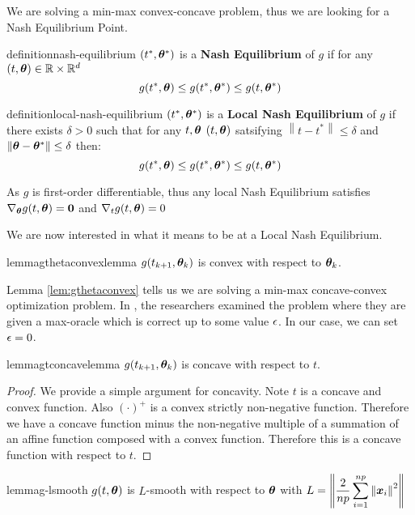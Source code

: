\documentclass{article} %
\newcommand{\norm}[1]{\left\lVert#1\right\rVert}
\begin{document}
		We are solving a min-max convex-concave problem, thus we are looking for a Nash Equilibrium Point. 
	
	\begin{restatable}{definition}{nash-equilibrium}
		\label{def:nash-equilibrium}
		$(t^*,{\bm{\theta}}^*)$ is a \textbf{Nash Equilibrium} of $g$ if for any $(t,{\bm{\theta}}) \in \mathbb{R}\times\mathbb{R}^d$\vspace{1em}
		\begin{equation}
			g(t^*,{\bm{\theta}}) \leq g(t^*,{\bm{\theta}}^*) \leq g(t,{\bm{\theta}}^*)
		\end{equation}
	\end{restatable}	
	\begin{restatable}{definition}{local-nash-equilibrium}
		\label{def:local-nash-equilibrium}
		$(t^*,{\bm{\theta}}^*)$ is a \textbf{Local Nash Equilibrium} of $g$ if there exists $\delta > 0$ such that for any $t,{\bm{\theta}}$ $(t,{\bm{\theta}})$ satsifying $\norm{t - t^*} \leq \delta$ and $\norm{\vtheta -\vtheta^*} \leq \delta$ then: 
		\vspace{1em}
		\begin{equation}
			g(t^*,{\bm{\theta}}) \leq g(t^*,{\bm{\theta}}^*) \leq g(t,{\bm{\theta}}^*)
		\end{equation}
	\end{restatable}
	\begin{proposition}\label{prop:first-order-nash}
		As $g$ is first-order differentiable, thus any local Nash Equilibrium satisfies $\nabla_{\bm{\theta}} g(t,{\bm{\theta}}) = \mathbf{0}$ and $\nabla_t g(t,{\bm{\theta}}) = 0$
	\end{proposition}
	
	We are now interested in what it means to be at a Local Nash Equilibrium. 
	
	\begin{restatable}{lemma}{gthetaconvexlemma}
		\label{lem:gthetaconvex}
		$g(t_{k+1},{\bm{\theta}}_k)$ is convex with respect to ${\bm{\theta}}_k$.
	\end{restatable}
	
	Lemma \ref{lem:gthetaconvex} tells us we are solving a min-max concave-convex optimization problem. In \cite{Jin_2019}, the researchers examined the problem where they are given a max-oracle which is correct up to some value ${\epsilon}$. In our case, we can set ${\epsilon} = 0$.
	
	\begin{restatable}{lemma}{gtconcavelemma}
		\label{lem:gtcomcavelemma}
		$g(t_{k+1},{\bm{\theta}}_k)$ is concave with respect to $t$.
	\end{restatable}
	\begin{proof}
		We provide a simple argument for concavity. Note $t$ is a concave and convex function. Also $(\cdot)^+$ is a convex strictly non-negative function. Therefore we have a concave function minus the non-negative multiple of a summation of an affine function composed with a convex function. Therefore this is a concave function with respect to $t$. 
	\end{proof}	
	\begin{restatable}{lemma}{g-lsmooth}
		\label{lem:g-lsmooth}
		$g(t,{\bm{\theta}})$ is $L$-smooth with respect to ${\bm{\theta}}$ with $\displaystyle L = \norm{\frac{2}{np}\sum_{i=1}^{np}\norm{\vx_i}^2}$ 
	\end{restatable}
	
\end{document}
